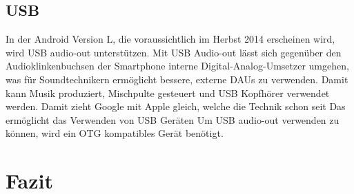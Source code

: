 \documentclass[12pt,journal,compsoc]{IEEEtran}
\begin{document}
\subsection{USB}
In der Android Version L, die voraussichtlich im Herbst 2014 erscheinen wird, wird USB audio-out unterstützen. Mit USB Audio-out lässt sich gegenüber den Audioklinkenbuchsen der Smartphone interne Digital-Analog-Umsetzer umgehen, was für Soundtechnikern ermöglicht bessere, externe DAUs zu verwenden.
Damit kann Musik produziert, Mischpulte gesteuert und USB Kopfhörer verwendet werden.
Damit zieht Google mit Apple gleich, welche die Technik schon seit 
Das ermöglicht das Verwenden von USB Geräten  
Um USB audio-out verwenden zu können, wird ein OTG kompatibles Gerät benötigt.

\section{Fazit}









\nocite{*}
\end{document}
